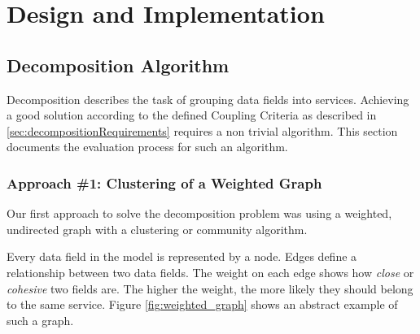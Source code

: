 
\chapter{Design and Implementation}
\label{cha:implementation}

\section{Decomposition Algorithm}

Decomposition describes the task of grouping data fields into services. Achieving a good solution according to the defined Coupling Criteria as described in \ref{sec:decompositionRequirements} requires a non trivial algorithm. This section documents the evaluation process for such an algorithm.

\subsection{Approach \#1: Clustering of a Weighted Graph}
\label{subsec:approach1_graph}

Our first approach to solve the decomposition problem was using a weighted, undirected graph with a clustering or community algorithm. 

Every data field in the model is represented by a node. Edges define a relationship between two data fields. The weight on each edge shows how \textit{close} or \textit{cohesive} two fields are. The higher the weight, the more likely they should belong to the same service. Figure \ref{fig:weighted_graph} shows an abstract example of such a graph.

